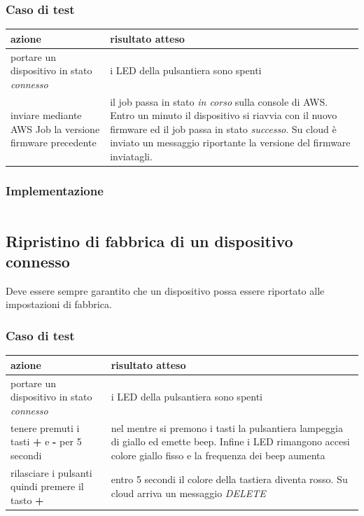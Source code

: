 \documentclass[12pt,a4paper,twoside,titlepage]{book}
\begin{document}
\subsubsection{Caso di test}
\begin{center}
\begin{tabular}{| p{} | p{} |}
    \hline \textbf{azione} & \textbf{risultato atteso} \\
    \hline portare un dispositivo in stato \textit{connesso} & i LED della pulsantiera sono spenti \\
    \hline inviare mediante AWS Job la versione firmware precedente & il job passa in stato \textit{in corso} sulla console di AWS. Entro un minuto il dispositivo si riavvia con il nuovo firmware ed il job passa in stato \textit{successo}. Su cloud è inviato un messaggio riportante la versione del firmware inviatagli. \\
    \hline
\end{tabular}
\end{center}

\subsubsection{Implementazione}
\inputminted{python3}{src/test_ota.py}

\subsection{Ripristino di fabbrica di un dispositivo connesso}
Deve essere sempre garantito che un dispositivo possa essere riportato alle impostazioni di fabbrica.

\subsubsection{Caso di test}
\begin{center}
\begin{tabular}{| p{} | p{} |}
    \hline \textbf{azione} & \textbf{risultato atteso} \\
    \hline portare un dispositivo in stato \textit{connesso} & i LED della pulsantiera sono spenti \\
    \hline tenere premuti i tasti \textbf{+} e \textbf{-} per 5 secondi & nel mentre si premono i tasti la pulsantiera lampeggia di giallo ed emette beep. Infine i LED rimangono accesi colore giallo fisso e la frequenza dei beep aumenta \\
    \hline rilasciare i pulsanti quindi premere il tasto \textbf{+} & entro 5 secondi il colore della tastiera diventa rosso. Su cloud arriva un messaggio \textit{DELETE} \\
    \hline
\end{tabular}
\end{center}
\end{document}
